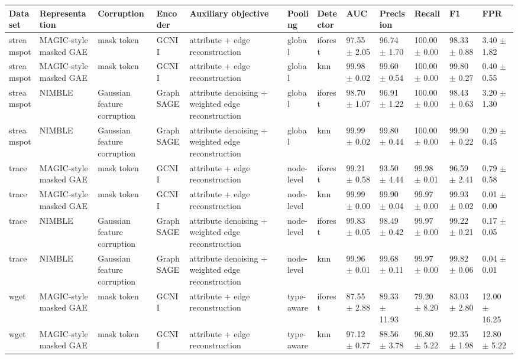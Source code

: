 \begin{tabular}{llllllllllll}
\toprule
Dataset & Representation & Corruption & Encoder & Auxiliary objective & Pooling & Detector & AUC & Precision & Recall & F1 & FPR \\
\midrule
streamspot & MAGIC-style masked GAE & mask token & GCNII & attribute + edge reconstruction & global & iforest & 97.55 $\pm$ 2.05 & 96.74 $\pm$ 1.70 & 100.00 $\pm$ 0.00 & 98.33 $\pm$ 0.88 & 3.40 $\pm$ 1.82 \\
streamspot & MAGIC-style masked GAE & mask token & GCNII & attribute + edge reconstruction & global & knn & 99.98 $\pm$ 0.02 & 99.60 $\pm$ 0.54 & 100.00 $\pm$ 0.00 & 99.80 $\pm$ 0.27 & 0.40 $\pm$ 0.55 \\
streamspot & NIMBLE & Gaussian feature corruption & GraphSAGE & attribute denoising + weighted edge reconstruction & global & iforest & 98.70 $\pm$ 1.07 & 96.91 $\pm$ 1.22 & 100.00 $\pm$ 0.00 & 98.43 $\pm$ 0.63 & 3.20 $\pm$ 1.30 \\
streamspot & NIMBLE & Gaussian feature corruption & GraphSAGE & attribute denoising + weighted edge reconstruction & global & knn & 99.99 $\pm$ 0.02 & 99.80 $\pm$ 0.44 & 100.00 $\pm$ 0.00 & 99.90 $\pm$ 0.22 & 0.20 $\pm$ 0.45 \\
trace & MAGIC-style masked GAE & mask token & GCNII & attribute + edge reconstruction & node-level & iforest & 99.21 $\pm$ 0.58 & 93.50 $\pm$ 4.44 & 99.98 $\pm$ 0.01 & 96.59 $\pm$ 2.41 & 0.79 $\pm$ 0.58 \\
trace & MAGIC-style masked GAE & mask token & GCNII & attribute + edge reconstruction & node-level & knn & 99.99 $\pm$ 0.00 & 99.90 $\pm$ 0.04 & 99.97 $\pm$ 0.00 & 99.93 $\pm$ 0.02 & 0.01 $\pm$ 0.00 \\
trace & NIMBLE & Gaussian feature corruption & GraphSAGE & attribute denoising + weighted edge reconstruction & node-level & iforest & 99.83 $\pm$ 0.05 & 98.49 $\pm$ 0.42 & 99.97 $\pm$ 0.00 & 99.22 $\pm$ 0.21 & 0.17 $\pm$ 0.05 \\
trace & NIMBLE & Gaussian feature corruption & GraphSAGE & attribute denoising + weighted edge reconstruction & node-level & knn & 99.96 $\pm$ 0.01 & 99.68 $\pm$ 0.11 & 99.97 $\pm$ 0.00 & 99.82 $\pm$ 0.06 & 0.04 $\pm$ 0.01 \\
wget & MAGIC-style masked GAE & mask token & GCNII & attribute + edge reconstruction & type-aware & iforest & 87.55 $\pm$ 2.88 & 89.33 $\pm$ 11.93 & 79.20 $\pm$ 8.20 & 83.03 $\pm$ 2.80 & 12.00 $\pm$ 16.25 \\
wget & MAGIC-style masked GAE & mask token & GCNII & attribute + edge reconstruction & type-aware & knn & 97.12 $\pm$ 0.77 & 88.56 $\pm$ 3.78 & 96.80 $\pm$ 5.22 & 92.35 $\pm$ 1.98 & 12.80 $\pm$ 5.22 \\

\end{tabular}
